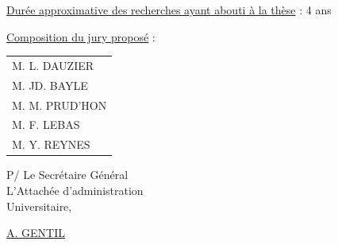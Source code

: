 \uline{Durée approximative des recherches ayant abouti à la thèse} : 4 ans

\uline{Composition du jury proposé} :
\begin{tabular}{l}
M. L. DAUZIER\\
M. JD. BAYLE\\
M. M. PRUD'HON\\
M. F. LEBAS\\
M. Y. REYNES
\end{tabular}

\begin{flushright}
P/ Le Secrétaire Général\\
L'Attachée d'administration\\
Universitaire,


\uline{A. GENTIL}
\end{flushright}
